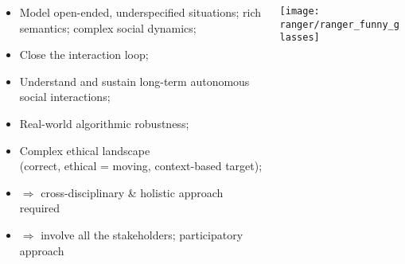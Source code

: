 \documentclass[xcolor=table,aspectratio=169]{beamer}
\begin{document}
\begin{frame}
\begin{columns}
\begin{column}{0.7\linewidth}
{                \begin{itemize}
                    \item<2-> Model open-ended, underspecified situations; rich
                        semantics; complex social dynamics;
                    \item<3-> Close the interaction loop;
                    \item<4-> Understand and sustain long-term autonomous social interactions;
                    \item<5-> Real-world algorithmic robustness;
                    \item<6-> Complex ethical landscape \\ (correct, ethical =
                        moving, context-based target);
                    \item<7-> $\Rightarrow$ cross-disciplinary \& holistic approach required
                    \item<7-> $\Rightarrow$ involve all the stakeholders;
                        participatory approach

                \end{itemize}




            }
        \end{column}
        \begin{column}{0.35\linewidth}
            \vspace{-2em}
            \begin{center}
                \texttt{[image: ranger/ranger\_funny\_glasses]}
            \end{center}
        \end{column}
    \end{columns}

\end{frame}
\end{document}
